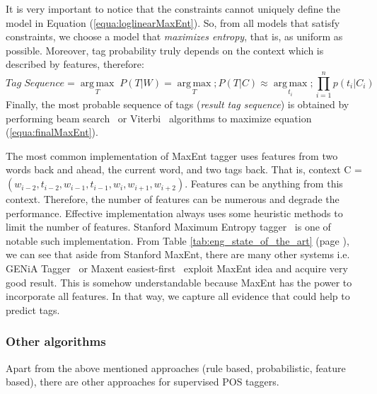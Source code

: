 It is very important to notice that the constraints cannot uniquely define the model in Equation (\ref{equa:loglinearMaxEnt}). So, from all models that satisfy constraints, we choose a model that \textit{maximizes entropy}, that is, as uniform as possible. Moreover, tag probability truly depends on the context which is described by features, therefore: 
\begin{equation}
\label{equa:finalMaxEnt}
Tag\; Sequence = \operatorname*{arg\,max}_{T} \;P(T|W) = \operatorname*{arg\,max}_{T}; P(T|C) \approx \operatorname*{arg\,max}_{t_i};\prod_{i=1}^{n} p(t_i|C_i)
\end{equation}
Finally, the most probable sequence of tags (\textit{result tag sequence}) is obtained by performing beam search~\cite{beamsearch} or Viterbi~\cite{Ryan:1993} algorithms to maximize equation (\ref{equa:finalMaxEnt}). 

The most common implementation of MaxEnt tagger uses features from two words back and ahead, the current word, and two tags back. That is, context C = $(w_{i-2},t_{i-2}, w_{i-1}, t_{i-1}, w_i, w_{i+1}, w_{i+2})$. Features can be anything from this context. Therefore, the number of features can be numerous and degrade the performance. Effective implementation always uses some heuristic methods to limit the number of features. Stanford Maximum Entropy tagger~\cite{Toutanova:2003} is one of notable such implementation. From Table \ref{tab:eng_state_of_the_art} (page \pageref{tab:eng_state_of_the_art}), we can see that aside from Stanford MaxEnt, there are many other systems i.e. GENiA Tagger~\cite{Toutanova03} or Maxent easiest-first~\cite{Tsuruoka:2005}  exploit MaxEnt idea and acquire very good result. This is somehow understandable because MaxEnt has the power to incorporate all features. In that way, we capture all evidence that could help to predict tags.  

\subsubsection{Other algorithms}
Apart from the above mentioned approaches (rule based, probabilistic, feature based), there are other approaches for supervised POS taggers. 

